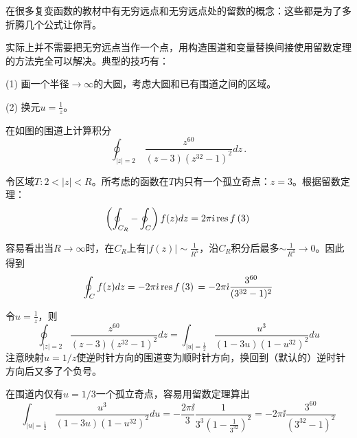 \documentclass[CJK]{beamer}
\begin{document}
\begin{frame}
\bch
在很多复变函数的教材中有无穷远点和无穷远点处的留数的概念：这些都是为了多折腾几个公式让你背\bye。

\skiplines

实际上并不需要把无穷远点当作一个点，用构造围道和变量替换间接使用留数定理的方法完全可以解决。典型的技巧有：
\bitem
\item[(1)]{画一个半径$\rightarrow \infty$的大圆，考虑大圆和已有围道之间的区域。}
\item[(2)]{换元$u=\frac{1}{z}$。}
\eitem
\ech
\end{frame}

\begin{frame}
\chtitle{\proid (\stwo)}
\bch
{}
在如图的围道上计算积分
$$\oint_{|z|=2}\,\frac{z^{60}}{(z-3)\left(z^{32}-1\right)^2} dz\,. $$
\ech
\end{frame}

\begin{frame}
\bch
{}

令区域$T: 2<|z|<R$。所考虑的函数在$T$内只有一个孤立奇点：$z=3$。根据留数定理：
$$\left(\oint_{C_R} - \oint_C\right) f(z) dz = 2\pi{\dot{\imath}}\,\mathrm{res}\,f\left(3\right)\, $$
\ech
\end{frame}

\begin{frame}
\bch
{}
容易看出当$R\rightarrow \infty$时，在$C_R$上有$|f(z)|\sim \frac{1}{R^5}$，沿$C_R$积分后最多$\sim \frac{1}{R^4} \rightarrow 0$。因此得到
$$ \oint_C f(z) dz  = -2\pi{\dot{\imath}} \,\mathrm{res}\,f\left(3\right)\, = -2\pi{\dot{\imath}}\frac{3^{60}}{(3^{32}-1)^2} $$
\ech
\end{frame}


\begin{frame}
\bch
令$u = \frac{1}{z}$，则
$$\oint_{|z|=2} \frac{z^{60}}{(z-3)\left(z^{32}-1\right)^2} dz = \int_{|u|=\frac{1}{2}} \frac{u^3}{(1-3u)\left(1-u^{32}\right)^2} du $$
{\scriptsize 注意映射$u=1/z$使逆时针方向的围道变为顺时针方向，换回到（默认的）逆时针方向后又多了个负号。}

在围道内仅有$u=1/3$一个孤立奇点，容易用留数定理算出
$$ \int_{|u|=\frac{1}{2}} \frac{u^3}{(1-3u)\left(1-u^{32}\right)^2} du = -\frac{2\pi\ii}{3} \frac{1}{3^3\left(1-\frac{1}{3^{32}}\right)^2} = -2\pi\ii \frac{3^{60}}{\left(3^{32}-1\right)^2} $$

\ech
\end{frame}
\end{document}
